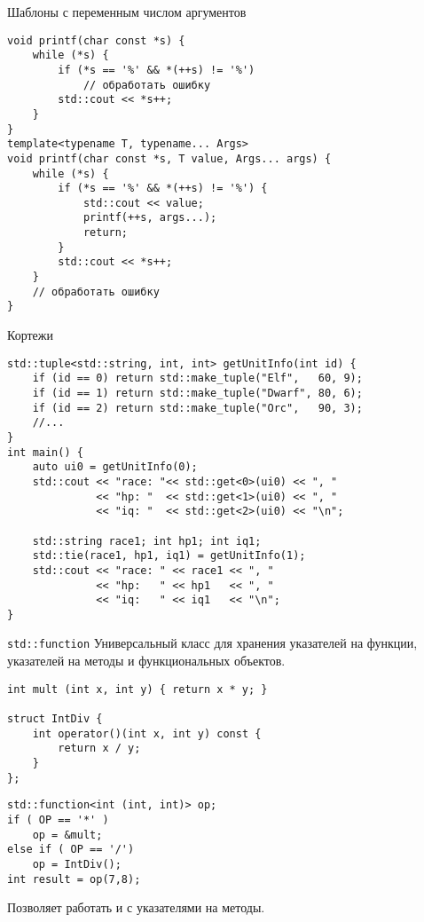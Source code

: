 \documentclass{beamer}
\begin{document}
\begin{frame}[fragile]{Шаблоны с переменным числом аргументов}
    \begin{lstlisting}
void printf(char const *s) {
    while (*s) {
        if (*s == '%' && *(++s) != '%')
            // обработать ошибку
        std::cout << *s++;
    }
}
template<typename T, typename... Args>
void printf(char const *s, T value, Args... args) {
    while (*s) {
        if (*s == '%' && *(++s) != '%') {
            std::cout << value;
            printf(++s, args...);
            return;
        }
        std::cout << *s++;
    }
    // обработать ошибку
}
\end{lstlisting}
\end{frame}


\begin{frame}[fragile]{Кортежи}
\begin{lstlisting}
std::tuple<std::string, int, int> getUnitInfo(int id) {
    if (id == 0) return std::make_tuple("Elf",	 60, 9);
    if (id == 1) return std::make_tuple("Dwarf", 80, 6);
    if (id == 2) return std::make_tuple("Orc", 	 90, 3);
    //...
}
int main() {
    auto ui0 = getUnitInfo(0);
    std::cout << "race: "<< std::get<0>(ui0) << ", "
              << "hp: "  << std::get<1>(ui0) << ", "
              << "iq: "  << std::get<2>(ui0) << "\n";
    
    std::string race1; int hp1; int iq1;
    std::tie(race1, hp1, iq1) = getUnitInfo(1);
    std::cout << "race: " << race1 << ", "
              << "hp:   " << hp1   << ", "
              << "iq:   " << iq1   << "\n";
}
\end{lstlisting}
\end{frame}


\begin{frame}[fragile]{{\tt std::function}}
Универсальный класс для хранения указателей на функции,\\
указателей на методы и функциональных объектов.
\begin{lstlisting}
int mult (int x, int y) { return x * y; }

struct IntDiv { 
    int operator()(int x, int y) const { 
        return x / y; 
    } 
};
\end{lstlisting}
\begin{lstlisting}
std::function<int (int, int)> op; 
if ( OP == '*' )
    op = &mult;
else if ( OP == '/')
    op = IntDiv();
int result = op(7,8);
\end{lstlisting}
                  
Позволяет работать и с указателями на методы.
\end{frame}
\end{document}
